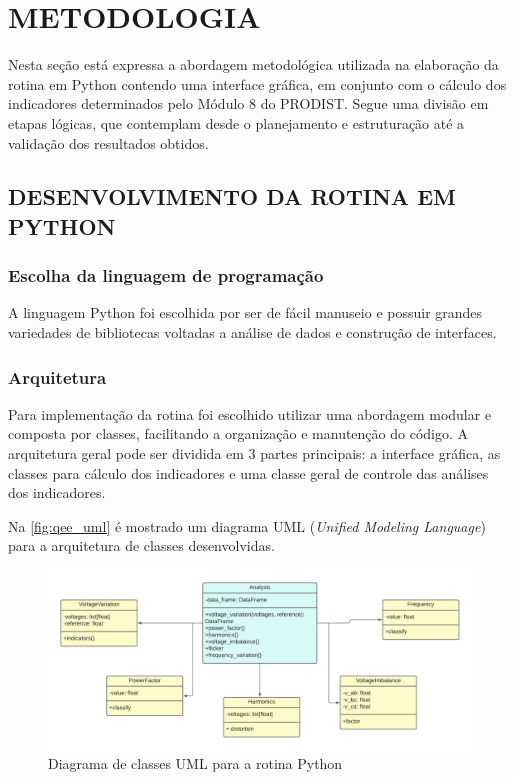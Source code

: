 \chapter{METODOLOGIA}

Nesta seção está expressa a abordagem metodológica utilizada na elaboração da rotina em Python contendo uma interface gráfica, em conjunto com o cálculo dos indicadores determinados pelo Módulo 8 do PRODIST. Segue uma divisão em etapas lógicas, que contemplam desde o planejamento e estruturação até a validação dos resultados obtidos.

\section{DESENVOLVIMENTO DA ROTINA EM PYTHON}

\subsection{Escolha da linguagem de programação}

A linguagem Python foi escolhida por ser de fácil manuseio e possuir grandes variedades de bibliotecas voltadas a análise de dados e construção de interfaces.

\subsection{Arquitetura}

Para implementação da rotina foi escolhido utilizar uma abordagem modular e composta por classes, facilitando a organização e manutenção do código. A arquitetura geral pode ser dividida em 3 partes principais: a interface gráfica, as classes para cálculo dos indicadores e uma classe geral de controle das análises dos indicadores.

Na \autoref{fig:qee_uml} é mostrado um diagrama UML (\textit{Unified Modeling Language}) para a arquitetura de classes desenvolvidas.

\begin{figure}[H]
	\centering
	\caption{Diagrama de classes UML para a rotina Python}
	\label{fig:qee_uml}
	\includegraphics[width=16cm]{illustrations/figures/qee_uml.pdf}
\end{figure}

